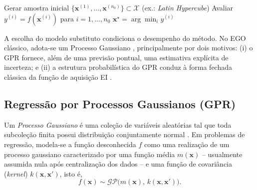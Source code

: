 \begin{algorithm}[!t]
\SetAlgoLined
\caption{EGO: Otimização Global Assistida por Surrogate}
\label{alg:ego}
Gerar amostra inicial $\{\bm{x}^{(1)}, \dots, \bm{x}^{(n_0)}\} \subset \mathcal{X}$ (ex.: \textit{Latin Hypercube})\;
Avaliar $y^{(i)} = f(\bm{x}^{(i)})$ para $i = 1, \dots, n_0$\;
\Return $\bm{x}^\star = \arg\min_i y^{(i)}$\;
\end{algorithm}

A escolha do modelo substituto condiciona o desempenho do método. No EGO clássico, adota-se um Processo Gaussiano , principalmente por dois motivos: (i) o GPR fornece, além de uma previsão pontual, uma estimativa explícita de incerteza; e (ii) a estrutura probabilística do GPR conduz à forma fechada clássica da função de aquisição EI .

\subsection{Regressão por Processos Gaussianos (GPR)}
\label{sec:fund_gpr}

Um \textit{Processo Gaussiano} é uma coleção de variáveis aleatórias tal que toda subcoleção finita possui distribuição conjuntamente normal . Em problemas de regressão, modela-se a função desconhecida $f$ como uma realização de um processo gaussiano caracterizado por uma função média $m(\bm{x})$ -- usualmente assumida nula após centralização dos dados -- e uma função de covariância (\textit{kernel}) $k(\bm{x}, \bm{x}')$, isto é,
\begin{equation}
    f(\bm{x}) \sim \mathcal{GP}\bigl(m(\bm{x}),\, k(\bm{x},\bm{x}')\bigr).
    \label{eq:gp}
\end{equation}

